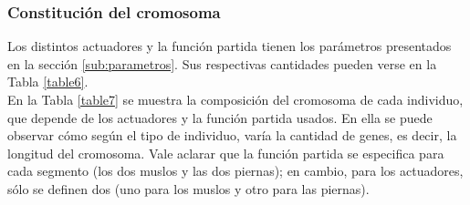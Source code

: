 \documentclass{article}
\begin{document}
\begin{table}[H]%
  \centering
  \captionsetup{justification=centering}
  \caption{Tipo de individuos }%
  \label{table5}%
\end{table}

\subsubsection{Constituci\'on del cromosoma}
Los distintos actuadores y la funci\'on partida tienen los par\'ametros presentados en la secci\'on \ref{sub:parametros}. Sus respectivas cantidades pueden verse en la Tabla \ref{table6}.\\
En la Tabla \ref{table7} se muestra la composici\'on del cromosoma de cada individuo, que depende de los actuadores y la funci\'on partida usados. En ella se puede observar c\'omo seg\'un el tipo de individuo, var\'ia la cantidad de genes, es decir, la longitud del cromosoma. Vale aclarar que la funci\'on partida se especifica para cada segmento (los dos muslos y las dos piernas); en cambio, para los actuadores, s\'olo se definen dos (uno para los muslos y otro para las piernas). \\
\end{document}
